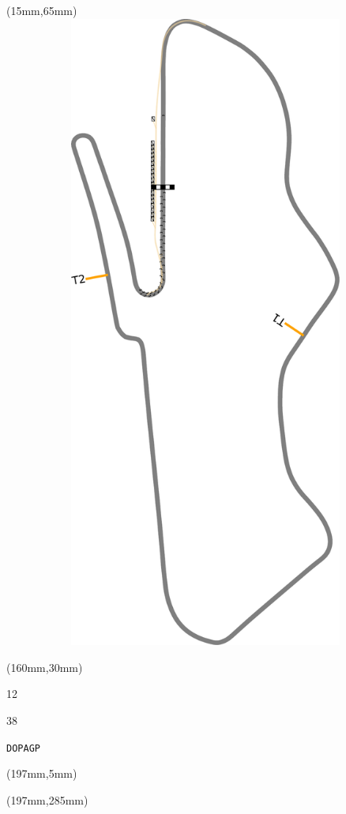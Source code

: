 \begin{textblock*}{185mm}(15mm,65mm)%
\centering
\mbox{\includegraphics[width=185mm,height=210mm,keepaspectratio]{PT/DOPAGP.pdf}}
\end{textblock*}
\begin{textblock*}{40mm}(160mm,30mm)%
\Large
\par{} 
\par12 
\par38 
\par\hfill\tiny\tt DOPAGP\\
\end{textblock*}
\begin{textblock*}{20mm}(197mm,5mm)%
\fbox{\thepage}
\label{DOPAGP}
\end{textblock*}
\begin{textblock*}{20mm}(197mm,285mm)%
\fbox{\thepage}
\end{textblock*}

